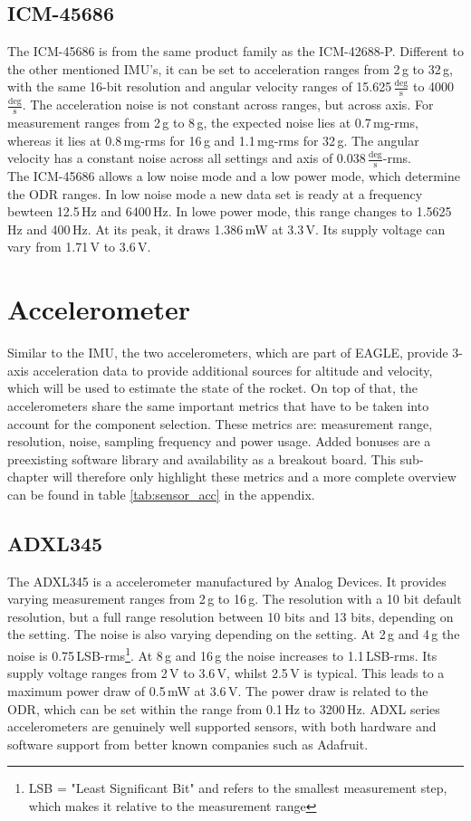 \documentclass[fontsize=11pt,%
twoside,%
BCOR          = 8mm, %
DIV           = 11,  %
titlepage     = off,%
index=totoc,%
xcolor        = pdftex,%
dvipsnames,%
bibliography  = totoc,%
bibliography = numbered, %
listof        = notnumbered]{scrreprt}
\begin{document}
\subsection{ICM-45686}
The ICM-45686 is from the same product family as the ICM-42688-P. Different to the other mentioned IMU's, it can be set to acceleration ranges from 2\,g to 32\,g, with the same 16-bit resolution and angular velocity ranges of 15.625\,$\frac{\text{deg}}{\text{s}}$ to 4000\,$\frac{\text{deg}}{\text{s}}$. The acceleration noise is not constant across ranges, but across axis. For measurement ranges from 2\,g to 8\,g, the expected noise lies at 0.7\,mg-rms, whereas it lies at 0.8\,mg-rms for 16\,g and 1.1\,mg-rms for 32\,g. The angular velocity has a constant noise across all settings and axis of 0.038\,$\frac{\text{deg}}{\text{s}}$-rms.\\
The ICM-45686 allows a low noise mode and a low power mode, which determine the ODR ranges. In low noise mode a new data set is ready at a frequency bewteen 12.5\,Hz and 6400\,Hz. In lowe power mode, this range changes to 1.5625\,Hz and 400\,Hz. At its peak, it draws 1.386\,mW at 3.3\,V. Its supply voltage can vary from 1.71\,V to 3.6\,V.

\section{Accelerometer}
Similar to the IMU, the two accelerometers, which are part of EAGLE, provide 3-axis acceleration data to provide additional sources for altitude and velocity, which will be used to estimate the state of the rocket. On top of that, the accelerometers share the same important metrics that have to be taken into account for the component selection. These metrics are: measurement range, resolution, noise, sampling frequency and power usage. Added bonuses are a preexisting software library and availability as a breakout board. This sub-chapter will therefore only highlight these metrics and a more complete overview can be found in table \ref{tab:sensor_acc} in the appendix.

\subsection{ADXL345}
The ADXL345 is a accelerometer manufactured by Analog Devices. It provides varying measurement ranges from 2\,g to 16\,g. The resolution with a 10 bit default resolution, but a full range resolution between 10 bits and 13 bits, depending on the setting. The noise is also varying depending on the setting. At 2\,g and 4\,g the noise is 0.75\,LSB-rms\footnote{LSB = "Least Significant Bit" and refers to the smallest measurement step, which makes it relative to the measurement range}. At 8\,g and 16\,g the noise increases to 1.1\,LSB-rms. Its supply voltage ranges from 2\,V to 3.6\,V, whilst 2.5\,V is typical. This leads to a maximum power draw of 0.5\,mW at 3.6\,V. The power draw is related to the ODR, which can be set within the range from 0.1\,Hz to 3200\,Hz. ADXL series accelerometers are genuinely well supported sensors, with both hardware and software support from better known companies such as Adafruit.
\end{document}
